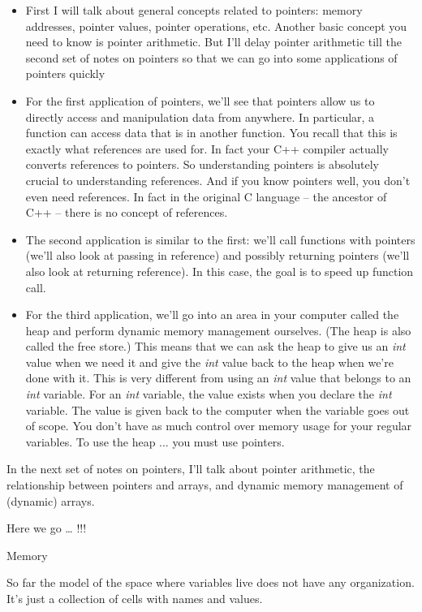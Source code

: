 \documentclass[
]{article}
\providecommand{\tightlist}{%
  \setlength{\itemsep}{0pt}\setlength{\parskip}{0pt}}
\begin{document}
\begin{itemize}
\tightlist
\item
  First I will talk about general concepts related to pointers: memory
  addresses, pointer values, pointer operations, etc. Another basic
  concept you need to know is pointer arithmetic. But I'll delay pointer
  arithmetic till the second set of notes on pointers so that we can go
  into some applications of pointers quickly
\item
  For the first application of pointers, we'll see that pointers allow
  us to directly access and manipulation data from anywhere. In
  particular, a function can access data that is in another function.
  You recall that this is exactly what references are used for. In fact
  your C++ compiler actually converts references to pointers. So
  understanding pointers is absolutely crucial to understanding
  references. And if you know pointers well, you don't even need
  references. In fact in the original C language -- the ancestor of C++
  -- there is no concept of references.
\item
  The second application is similar to the first: we'll call functions
  with pointers (we'll also look at passing in reference) and possibly
  returning pointers (we'll also look at returning reference). In this
  case, the goal is to speed up function call.
\item
  For the third application, we'll go into an area in your computer
  called the heap and perform dynamic memory management ourselves. (The
  heap is also called the free store.) This means that we can ask the
  heap to give us an \emph{int} value when we need it and give the
  \emph{int} value back to the heap when we're done with it. This is
  very different from using an \emph{int} value that belongs to an
  \emph{int} variable. For an \emph{int} variable, the value exists when
  you declare the \emph{int} variable. The value is given back to the
  computer when the variable goes out of scope. You don't have as much
  control over memory usage for your regular variables. To use the heap
  ... you must use pointers.
\end{itemize}

In the next set of notes on pointers, I'll talk about pointer
arithmetic, the relationship between pointers and arrays, and dynamic
memory management of (dynamic) arrays.

Here we go \ldots{} !!!

Memory

So far the model of the space where variables live does not have any
organization. It's just a collection of cells with names and values.
\end{document}
